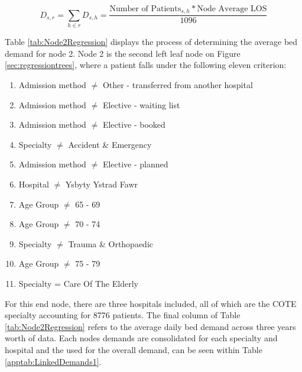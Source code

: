 \documentclass[../thesis.tex]{subfiles}
\begin{document}
\begin{equation}\label{eq:treedemand1}
        D_{s,r} = \sum\limits_{h \in r} D_{s,h} = \frac{\text{Number of Patients}_{s,h}*\text{Node Average LOS}}{1096}
\end{equation}

Table \ref{tab:Node2Regression} displays the process of determining the average bed demand for node 2. Node 2 is the second left leaf node on Figure \ref{sec:regressiontrees}, where a patient falls under the following eleven criterion:
\begin{enumerate}
    \item Admission method $\neq$ Other - transferred from another hospital
    \item Admission method $\neq$ Elective - waiting list
    \item Admission method $\neq$ Elective - booked
    \item Specialty $\neq$ Accident \& Emergency
    \item Admission method $\neq$ Elective - planned
    \item Hospital $\neq$ Ysbyty Ystrad Fawr
    \item Age Group $\neq$ 65 - 69
    \item Age Group $\neq$ 70 - 74
    \item Specialty $\neq$ Trauma \& Orthopaedic
    \item Age Group $\neq$ 75 - 79
    \item Specialty = Care Of The Elderly
\end{enumerate}

For this end node, there are three hospitals included, all of which are the COTE specialty accounting for 8776 patients. The final column of Table \ref{tab:Node2Regression} refers to the average daily bed demand across three years worth of data. Each nodes demands are consolidated for each specialty and hospital and the used for the overall demand, can be seen within Table \ref{apptab:LinkedDemands1}.
\begin{table}[h!]
    \centering{}
    \caption{Regression Tree Node 2 - Average LOS}
    \label{tab:Node2Regression}
\end{table}
\end{document}
